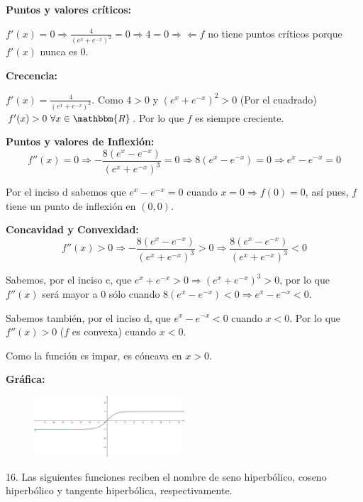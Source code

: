 \documentclass[12pt]{article}
\begin{document}
\begin{enumerate}[\hspace{9px} a)]
        \textbf{Puntos y valores cr\'iticos: }\medskip

            \(f'(x)=0 \Longrightarrow \frac{4}{(e^x+e^{-x})^2}=0 \Longrightarrow 4=0\Rightarrow\!\Leftarrow\)\quad \(f\) no tiene puntos cr\'iticos porque \(f'(x)\) nunca es 0.\medskip

        \textbf{Crecencia: }\medskip

            \(f'(x)=\frac{4}{(e^x+e^{-x})^2}\). Como $4>0$ y $(e^x+e^{-x})^2>0$ (Por el cuadrado) \(f'(x)>0 \ \forall x\in \mathbbm{R}\). Por lo que $f$ es siempre creciente.\medskip

        \textbf{Puntos y valores de Inflexi\'on: }
            \[f''(x)=0 \Longrightarrow -\frac{8(e^x-e^{-x})}{(e^x+e^{-x})^3}=0 \Longrightarrow 8(e^x-e^{-x})=0 \Longrightarrow e^x-e^{-x}=0\]

            Por el inciso d sabemos que \(e^x-e^{-x}=0\) cuando \(x=0 \Longrightarrow f(0)=0\), as\'i pues, $f$ tiene un punto de inflexi\'on en \((0,0)\).\medskip

        \textbf{Concavidad y Convexidad: }\medskip
            \[f''(x)>0 \Longrightarrow -\frac{8(e^x-e^{-x})}{(e^x+e^{-x})^3}>0 \Longrightarrow \frac{8(e^x-e^{-x})}{(e^x+e^{-x})^3}<0\]

            Sabemos, por el inciso c, que \(e^x+e^{-x}>0 \Longrightarrow (e^x+e^{-x})^3>0\), por lo que \(f''(x)\) ser\'a mayor a 0 s\'olo cuando \(8(e^x-e^{-x})<0 \Longrightarrow e^x-e^{-x}<0\).\medskip

            Sabemos tambi\'en, por el inciso d, que \(e^x-e^{-x}<0\) cuando \(x<0\). Por lo que \(f''(x)>0\) ($f$ es convexa) cuando \(x<0\).\medskip

            Como la funci\'on es impar, es c\'oncava en \(x>0\).\medskip

        \textbf{Gr\'afica: }\medskip

        \begin{figure}[ht]
            \centering
            \includegraphics[width=0.5\textwidth]{15-e}
        \end{figure}

\end{enumerate}

16. Las siguientes funciones reciben el nombre de seno hiperb\'olico, coseno hiperb\'olico y tangente hiperb\'olica, respectivamente.
\end{document}
